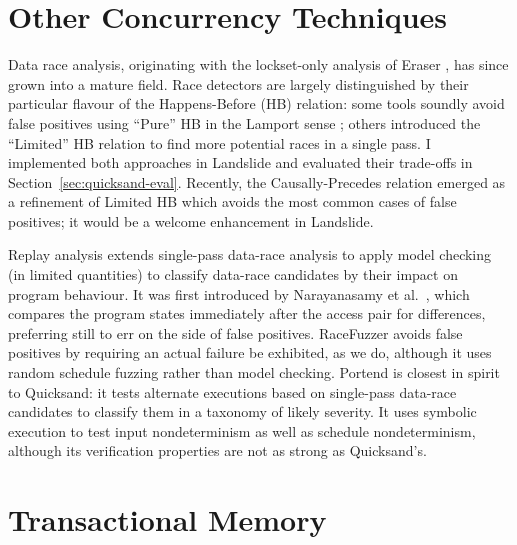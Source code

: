 \section{Other Concurrency Techniques}

Data race analysis, originating with the lockset-only analysis of Eraser \cite{eraser},
has since grown into a mature field.
Race detectors are largely distinguished by their particular flavour of the Happens-Before (HB) relation:
some tools \cite{fasttrack,djit} soundly avoid false positives using ``Pure'' HB in the Lamport sense \cite{lamport-clocks};
others \cite{tsan,hybriddatarace} introduced the ``Limited'' HB relation to find more potential races in a single pass.
I implemented both approaches in Landslide and evaluated their trade-offs in Section~\ref{sec:quicksand-eval}.
%
Recently, the Causally-Precedes relation \cite{predictive-dr} emerged as a refinement of Limited HB which avoids the most common cases of false positives; it would be a welcome enhancement in Landslide.

Replay analysis extends single-pass data-race analysis to apply model checking (in limited quantities) to classify data-race candidates by their impact on program behaviour.
It was first introduced by Narayanasamy et al.~\cite{recordreplaydrs}, which compares the program states immediately after the access pair for differences, preferring still to err on the side of false positives.
RaceFuzzer \cite{racefuzzer} avoids false positives by requiring an actual failure be exhibited, as we do,
although it uses random schedule fuzzing rather than model checking.
%
Portend \cite{portend} is closest in spirit to Quicksand:
it tests alternate executions based on single-pass data-race candidates to classify them in a taxonomy of likely severity.
It uses symbolic execution to test input nondeterminism as well as schedule nondeterminism,
although its verification properties are not as strong as Quicksand's.


\section{Transactional Memory}
\label{sec:related-tm}

